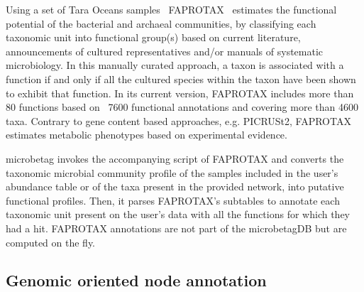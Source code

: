 \documentclass[sn-mathphys,Numbered]{sn-jnl}%
\theoremstyle{thmstyleone}%
\theoremstyle{thmstyletwo}%
\theoremstyle{thmstylethree}%
\begin{document}
        Using a set of Tara Oceans samples~\cite{sunagawa2015structure} FAPROTAX~\cite{louca2016decoupling} estimates the functional potential of the bacterial and archaeal communities, by classifying each taxonomic unit into functional group(s) based on current literature,
        announcements of cultured representatives and/or manuals of systematic microbiology. 
        In this manually curated approach, a taxon is associated with a function if and only if all the cultured species within the taxon have been shown to exhibit that function. 
        In its current version, FAPROTAX includes more than 80 functions based on ~7600 functional annotations and covering more than 4600 taxa.
        Contrary to gene content based approaches, e.g. PICRUSt2, FAPROTAX  estimates metabolic phenotypes based on experimental evidence. 

        microbetag invokes the accompanying script of FAPROTAX and converts the taxonomic microbial community profile of the samples included in the user's abundance table or of the taxa present in the provided network, into putative functional profiles.
        Then, it parses FAPROTAX's subtables to annotate each taxonomic unit present on the user's data with all the functions for which they had a hit. 
        FAPROTAX annotations are not part of the microbetagDB but are computed on the fly.


    \subsection*{ Genomic oriented node annotation }
        \label{subsec:phen}
\end{document}
